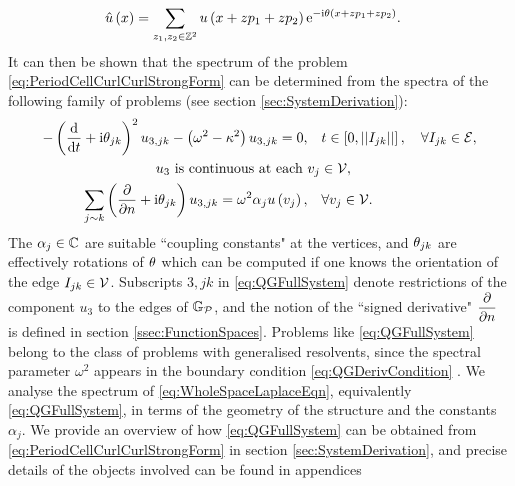 \begin{align*}
	\hat{u}\left( x \right) &= \sum_{z_1,z_2\in\mathbb{Z}^2}u\left( x+zp_1+zp_2 \right)\mathrm{e}^{-\mathrm{i}\theta\left( x+zp_1+zp_2 \right)}.
\end{align*}
It can then be shown that the spectrum of the problem \eqref{eq:PeriodCellCurlCurlStrongForm} can be determined from the spectra of the following family of problems (see section \ref{sec:SystemDerivation}):
\begin{subequations} \label{eq:QGFullSystem}
	\begin{align}
		- \left(  \dfrac{\mathrm{d}}{\mathrm{d}t} + \mathrm{i}\theta_{jk}  \right)^2 u_{3,jk} - \left( \omega^2-\kappa^2 \right)u_{3,jk} = 0, &\quad t\in\left[ 0,\left\lvert \left\lvert I_{jk} \right\rvert \right\rvert \right], \quad\forall I_{jk}\in\mathcal{E}, \\
		u_3 \text{ is continuous at each } & v_j\in\mathcal{V}, \\
		\sum_{j\sim k}\left(  \dfrac{\partial }{\partial n} + \mathrm{i}\theta_{jk}  \right)u_{3,jk} = \omega^2\alpha_j u\left( v_j \right), &\quad\forall v_j\in\mathcal{V}.
	\end{align}
\end{subequations}
The $\alpha_j\in\mathbb{C}$ are suitable ``coupling constants" at the vertices, and $\theta_{jk}$ are effectively rotations of $\theta$ which can be computed if one knows the orientation of the edge $I_{jk}\in\mathcal{V}$.
Subscripts $3,jk$ in \eqref{eq:QGFullSystem} denote restrictions of the component $u_3$ to the edges of $\mathbb{G}_{\mathcal{P}}$, and the notion of the ``signed derivative" $\dfrac{\partial }{\partial n}$ is defined in section \ref{ssec:FunctionSpaces}.
Problems like \eqref{eq:QGFullSystem} belong to the class of problems with generalised resolvents, since the spectral parameter $\omega^2$ appears in the boundary condition \eqref{eq:QGDerivCondition} \cite{strauss1954generalized, strauss1968extensions, strauss1998functional, cherednichenko2018effective}.
We analyse the spectrum of \eqref{eq:WholeSpaceLaplaceEqn}, equivalently \eqref{eq:QGFullSystem}, in terms of the geometry of the structure and the constants $\alpha_j$.
We provide an overview of how \eqref{eq:QGFullSystem} can be obtained from \eqref{eq:PeriodCellCurlCurlStrongForm} in section \ref{sec:SystemDerivation}, and precise details of the objects involved can be found in appendices 